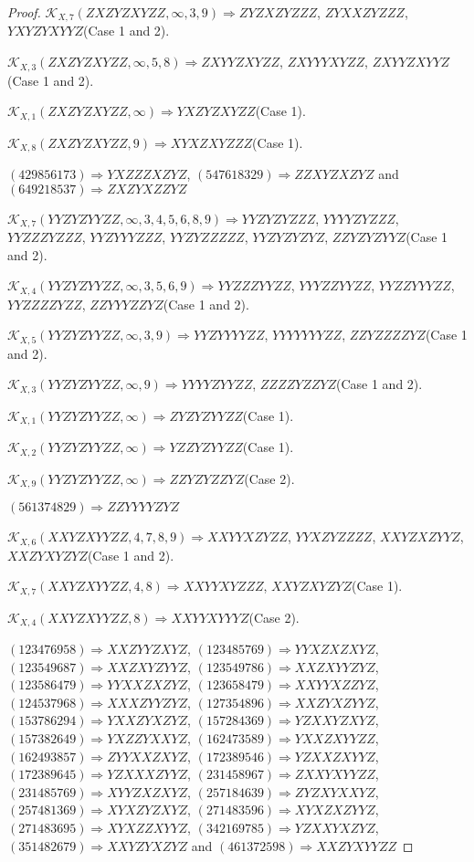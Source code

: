 \documentclass[12pt]{article}
\theoremstyle{plain}
\theoremstyle{definition}
\theoremstyle{remark}
\newcommand{\fancy}[1]{\mathcal{#1}}
\def\K{\fancy{K}}
\begin{document}
\begin{proof}
	$\K_{X,7}(ZXZYZXYZZ,\infty,3, 9)\Rightarrow $$ZYZXZYZZZ$, $ZYXXZYZZZ$, $YXYZYXYYZ$(Case 1 and 2).
	
	$\K_{X,3}(ZXZYZXYZZ,\infty,5, 8)\Rightarrow $$ZXYYZXYZZ$, $ZXYYYXYZZ$, $ZXYYZXYYZ$(Case 1 and 2).
	
	$\K_{X,1}(ZXZYZXYZZ,\infty)\Rightarrow $$YXZYZXYZZ$(Case 1).
	
	$\K_{X,8}(ZXZYZXYZZ,9)\Rightarrow $$XYXZXYZZZ$(Case 1).
	
	
	
	$(4 2 9 8 5 6 1 7 3)\Rightarrow YXZZZXZYZ$, $(5 4 7 6 1 8 3 2 9)\Rightarrow ZZXYZXZYZ$ and $(6 4 9 2 1 8 5 3 7)\Rightarrow ZXZYXZZYZ$
	
	
	$\K_{X,7}(YYZYZYYZZ,\infty,3, 4, 5, 6, 8, 9)\Rightarrow $$YYZYZYZZZ$, $YYYYZYZZZ$, $YYZZZYZZZ$, $YYZYYYZZZ$, $YYZYZZZZZ$, $YYZYZYZYZ$, $ZZYZYZYYZ$(Case 1 and 2).
	
	$\K_{X,4}(YYZYZYYZZ,\infty,3, 5, 6, 9)\Rightarrow $$YYZZZYYZZ$, $YYYZZYYZZ$, $YYZZYYYZZ$, $YYZZZZYZZ$, $ZZYYYZZYZ$(Case 1 and 2).
	
	$\K_{X,5}(YYZYZYYZZ,\infty,3, 9)\Rightarrow $$YYZYYYYZZ$, $YYYYYYYZZ$, $ZZYZZZZYZ$(Case 1 and 2).
	
	$\K_{X,3}(YYZYZYYZZ,\infty,9)\Rightarrow $$YYYYZYYZZ$, $ZZZZYZZYZ$(Case 1 and 2).
	
	$\K_{X,1}(YYZYZYYZZ,\infty)\Rightarrow $$ZYZYZYYZZ$(Case 1).
	
	$\K_{X,2}(YYZYZYYZZ,\infty)\Rightarrow $$YZZYZYYZZ$(Case 1).
	
	$\K_{X,9}(YYZYZYYZZ,\infty)\Rightarrow $$ZZYZYZZYZ$(Case 2).
	
	
	
	$(5 6 1 3 7 4 8 2 9)\Rightarrow ZZYYYYZYZ$
	
	
	$\K_{X,6}(XXYZXYYZZ,4, 7, 8, 9)\Rightarrow $$XXYYXZYZZ$, $YYXZYZZZZ$, $XXYZXZYYZ$, $XXZYXYZYZ$(Case 1 and 2).
	
	$\K_{X,7}(XXYZXYYZZ,4, 8)\Rightarrow $$XXYYXYZZZ$, $XXYZXYZYZ$(Case 1).
	
	$\K_{X,4}(XXYZXYYZZ,8)\Rightarrow $$XXYYXYYYZ$(Case 2).
	
	
	
	$(1 2 3 4 7 6 9 5 8)\Rightarrow XXZYYZXYZ$, $(1 2 3 4 8 5 7 6 9)\Rightarrow YYXZXZXYZ$, $(1 2 3 5 4 9 6 8 7)\Rightarrow XXZXYZYYZ$, $(1 2 3 5 4 9 7 8 6)\Rightarrow XXZXYYZYZ$, $(1 2 3 5 8 6 4 7 9)\Rightarrow YYXXZXZYZ$, $(1 2 3 6 5 8 4 7 9)\Rightarrow XXYYXZZYZ$, $(1 2 4 5 3 7 9 6 8)\Rightarrow XXXZYYZYZ$, $(1 2 7 3 5 4 8 9 6)\Rightarrow XXZYXZYYZ$, $(1 5 3 7 8 6 2 9 4)\Rightarrow YXXZYXZYZ$, $(1 5 7 2 8 4 3 6 9)\Rightarrow YZXXYZXYZ$, $(1 5 7 3 8 2 6 4 9)\Rightarrow YXZZYXXYZ$, $(1 6 2 4 7 3 5 8 9)\Rightarrow YXXZXYYZZ$, $(1 6 2 4 9 3 8 5 7)\Rightarrow ZYYXXZXYZ$, $(1 7 2 3 8 9 5 4 6)\Rightarrow YZXXZXYYZ$, $(1 7 2 3 8 9 6 4 5)\Rightarrow YZXXXZYYZ$, $(2 3 1 4 5 8 9 6 7)\Rightarrow ZXXYXYYZZ$, $(2 3 1 4 8 5 7 6 9)\Rightarrow XYYZXZXYZ$, $(2 5 7 1 8 4 6 3 9)\Rightarrow ZYZXYXXYZ$, $(2 5 7 4 8 1 3 6 9)\Rightarrow XYXZYZXYZ$, $(2 7 1 4 8 3 5 9 6)\Rightarrow XYXZXZYYZ$, $(2 7 1 4 8 3 6 9 5)\Rightarrow XYXZZXYYZ$, $(3 4 2 1 6 9 7 8 5)\Rightarrow YZXXYXZYZ$, $(3 5 1 4 8 2 6 7 9)\Rightarrow XXYZYXZYZ$ and $(4 6 1 3 7 2 5 9 8)\Rightarrow XXZYXYYZZ$
	

\end{proof}
\end{document}
